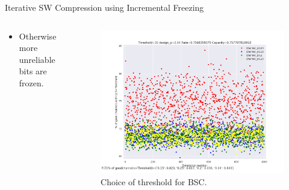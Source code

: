 \documentclass[final,hyperref={pdfpagelabels=false}]{beamer}
\begin{document}
\begin{frame}[t]
\begin{columns}[t]
\begin{column}{.465\textwidth}
\begin{block}{Iterative SW Compression using Incremental Freezing }
\begin{columns}
\begin{column}{.5\textwidth}
\begin{itemize}
\begin{itemize}
\item Otherwise more unreliable bits are frozen.
\end{itemize}
\end{itemize}
\end{column}
\begin{column}{.5\textwidth}
\begin{figure}
\includegraphics[width=0.9\linewidth]{theta-0p4.png}
\caption{Choice of threshold for BSC.}
\end{figure}
\end{column}
\end{columns}
\end{block}



\end{column}
\end{columns}
\end{frame}
\end{document}
